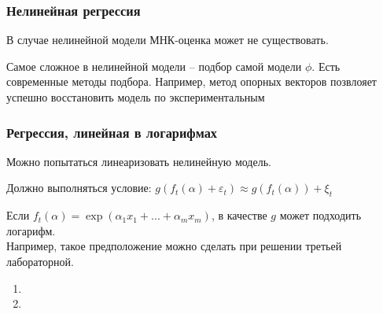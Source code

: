 \documentclass[main.tex]{subfiles}
\begin{document}
\subsubsection{ Нелинейная регрессия }

В случае нелинейной модели МНК-оценка может не существовать.

Самое сложное в нелинейной модели -- подбор самой модели $ \phi $.
Есть современные методы подбора.
Например, метод опорных векторов позвлояет успешно восстановить модель по экспериментальным

\subsubsection{ Регрессия, линейная в логарифмах }

Можно попытаться линеаризовать нелинейную модель.

Должно выполняться условие: $ g(f_t( \alpha ) + \varepsilon_t) \approx g(f_t(\alpha)) + \xi_t $

Если $ f_t(\alpha) = \exp( \alpha_1 x_1 + ... + \alpha_m x_m ) $, в качестве  $ g $ может подходить логарифм. \\

Например, такое предположение можно сделать при решении третьей лабораторной.

\begin{enumerate}[noitemsep]
    \item
    \item
\end{enumerate}
\end{document}
